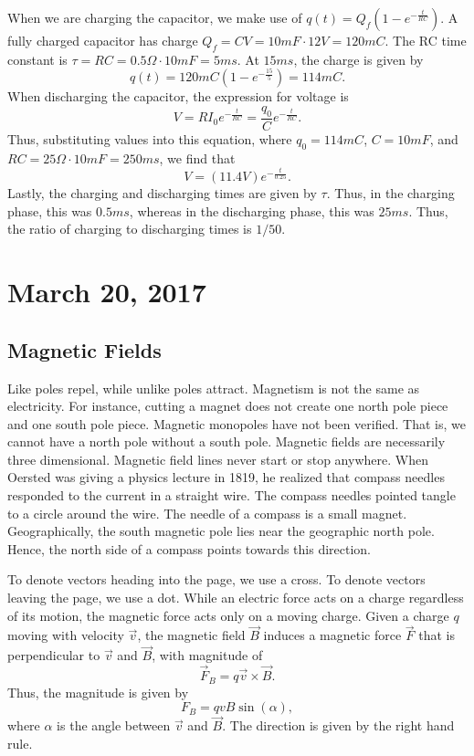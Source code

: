 \documentclass[11pt]{article}
\theoremstyle{plain} %
\theoremstyle{definition}
\theoremstyle{example}
\theoremstyle{remark}
\begin{document}
When we are charging the capacitor, we make use of $q(t) = Q_f\left(1-e^{-\frac{t}{RC}}\right)$. A fully charged capacitor has charge $Q_f = CV = 10mF \cdot 12V = 120mC$. The RC time constant is $\tau = RC = 0.5\Omega \cdot 10mF = 5ms$. At $15ms$, the charge is given by 
$$q(t) = 120mC\left(1-e^{-\frac{15}{5}}\right) = 114mC.$$
When discharging the capacitor, the expression for voltage is 
$$V = RI_0e^{-\frac{t}{RC}} = \frac{q_0}{C}e^{-\frac{t}{RC}}.$$
Thus, substituting values into this equation, where $q_0 = 114mC$, $C = 10mF$, and $RC = 25\Omega \cdot 10mF = 250ms$, we find that 
$$V = (11.4V)e^{-\frac{t}{0.25}}.$$
Lastly, the charging and discharging times are given by $\tau$. Thus, in the charging phase, this was $0.5ms$, whereas in the discharging phase, this was $25ms$. Thus, the ratio of charging to discharging times is $1/50$. 

\section{March 20, 2017}
\subsection{Magnetic Fields}

Like poles repel, while unlike poles attract. Magnetism is not the same as electricity. For instance, cutting a magnet does not create one north pole piece and one south pole piece. Magnetic monopoles have not been verified. That is, we cannot have a north pole without a south pole. Magnetic fields are necessarily three dimensional. Magnetic field lines never start or stop anywhere. When Oersted was giving a physics lecture in 1819, he realized that compass needles responded to the current in a straight wire. The compass needles pointed tangle to a circle around the wire. The needle of a compass is a small magnet. Geographically, the south magnetic pole lies near the geographic north pole. Hence, the north side of a compass points towards this direction. 

To denote vectors heading into the page, we use a cross. To denote vectors leaving the page, we use a dot. While an electric force acts on a charge regardless of its motion, the magnetic force acts only on a moving charge. Given a charge $q$ moving with velocity $\vec{v}$, the magnetic field $\vec{B}$ induces a magnetic force $\vec{F}$ that is perpendicular to $\vec{v}$ and $\vec{B}$, with magnitude of 
$$\vec{F}_B = q\vec{v} \times \vec{B}.$$
Thus, the magnitude is given by 
$$F_B = qvB\sin(\alpha),$$
where $\alpha$ is the angle between $\vec{v}$ and $\vec{B}$. The direction is given by the right hand rule. 
\end{document}
